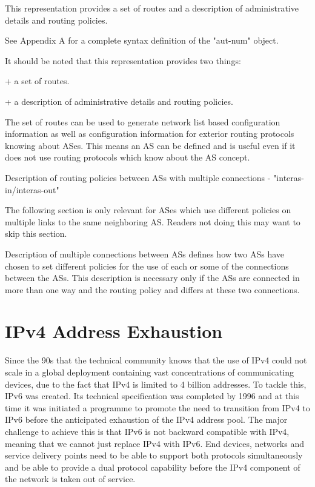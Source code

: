 \documentclass[11pt,a4paper]{scrreprt}
\begin{document}
This representation provides a set of routes and a description of administrative details and routing policies. 
        
        
          
          
          
          


	See Appendix A for a complete syntax definition of the "aut-num"
   object.


   It should be noted that this representation provides two things:

       + a set of routes.

       + a description of administrative details and routing policies.

   The set of routes can be used to generate network list based
   configuration information as well as configuration information for
   exterior routing protocols knowing about ASes. This means an AS can
   be defined and is useful even if it does not use routing protocols
   which know about the AS concept.

   Description of routing policies between ASs with multiple connections
   - "interas-in/interas-out"

   The following section is only relevant for ASes which use different
   policies on multiple links to the same neighboring AS. Readers not
   doing this may want to skip this section.

   Description of multiple connections between ASs defines how two ASs
   have chosen to set different policies for the use of each or some of
   the connections between the ASs.  This description is necessary only
   if the ASs are connected in more than one way and the routing policy
   and differs at these two connections.

\section{IPv4 Address Exhaustion}

Since the 90s that the technical community knows that the use of IPv4 could not scale in a global deployment containing vast concentrations of communicating devices, due to the fact that IPv4 is limited to 4 billion addresses. To tackle this, IPv6 was created. Its technical specification was completed by 1996 and at this time it was initiated a programme to promote the need to transition from IPv4 to IPv6 before the anticipated exhaustion of the IPv4 address pool. The major challenge to achieve this is that IPv6 is not backward compatible with IPv4, meaning that we cannot just replace IPv4 with IPv6. End devices, networks and service delivery points need to be able to support both protocols simultaneously and be able to provide a dual protocol capability before the IPv4 component of the network is taken out of service.     
\end{document}
